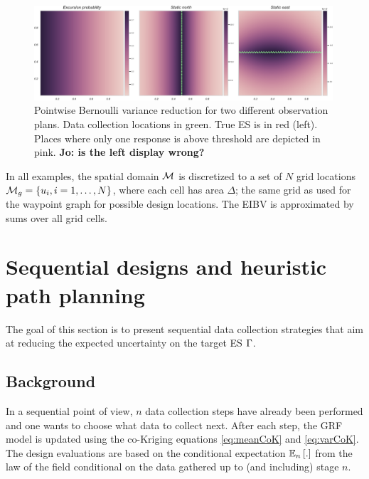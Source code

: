 \documentclass[aoas]{imsart}
\begin{document}
\begin{figure}[h!] \centering
  \includegraphics[width=0.99\textwidth]{Figures/ebv_north_vs_east_2.png}
  \caption{Pointwise Bernoulli variance reduction for two different observation plans. Data collection locations in green. True ES is in red (left). Places where only one response is above threshold are depicted in pink. {\bf{Jo: is the left display wrong?}}}
\label{fig:ebv_north_vs_east}
\end{figure}

In all examples, the spatial domain $\mathcal{M}$ is discretized to a set of $N$ grid
locations $\mathcal{M}_g = \{u_i, i=1,\ldots,N \}$, where each cell
has area $\Delta$; the same grid as used for the waypoint graph for
possible design locations. The EIBV is approximated by sums over all
grid cells.



\section{Sequential designs and heuristic path planning}\label{sec:heuristics}

The goal of this section is to present sequential data collection strategies that aim at reducing the expected uncertainty on the target ES $\Gamma$.

\subsection{Background}

In a sequential point of view, $n$ data collection steps have already been performed and one wants to choose what data to collect next. After each step, the GRF model is updated using the co-Kriging equations \ref{eq:meanCoK} and \ref{eq:varCoK}. The design evaluations are based on the conditional expectation
$\mathbb{E}_{n} \left[.\right]$ from the law of the field conditional on the data gathered up to (and including) stage $n$. 
\end{document}
